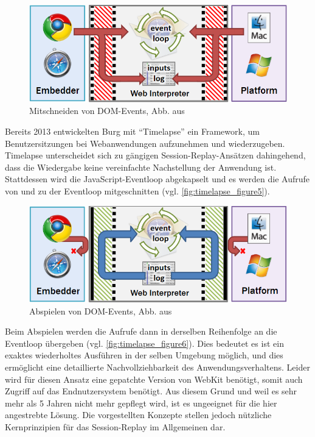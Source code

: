 \begin{figure}
\centering
\includegraphics[width=\linewidth]{img/03_methoden/timelapse_figure5.png}
\caption{Mitschneiden von DOM-Events, Abb. aus \cite{TimelapsePaper}}
\label{fig:timelapse_figure5}
\end{figure}

Bereits 2013 entwickelten Burg \etal \cite{TimelapsePaper} mit \enquote{Timelapse} ein Framework, um Benutzersitzungen bei Webanwendungen aufzunehmen und wiederzugeben. Timelapse unterscheidet sich zu gängigen Session-Replay-Ansätzen dahingehend, dass die Wiedergabe keine vereinfachte Nachstellung der Anwendung ist. Stattdessen wird die JavaScript-Eventloop abgekapselt und es werden die Aufrufe von und zu der Eventloop mitgeschnitten (vgl. \autoref{fig:timelapse_figure5}).

\begin{figure}
\centering
\includegraphics[width=\linewidth]{img/03_methoden/timelapse_figure6.png}
\caption{Abspielen von DOM-Events, Abb. aus \cite{TimelapsePaper}}
\label{fig:timelapse_figure6}
\end{figure}

Beim Abspielen werden die Aufrufe dann in derselben Reihenfolge an die Eventloop übergeben (vgl. \autoref{fig:timelapse_figure6}). Dies bedeutet es ist ein exaktes wiederholtes Ausführen in der selben Umgebung möglich, und dies ermöglicht eine detaillierte Nachvollziehbarkeit des Anwendungsverhaltens. Leider wird für diesen Ansatz eine gepatchte Version von WebKit benötigt, somit auch Zugriff auf das Endnutzersystem benötigt. Aus diesem Grund und weil es sehr mehr als 5 Jahren nicht mehr gepflegt wird\footnotemark{}, ist es ungeeignet für die hier angestrebte Lösung. Die vorgestellten Konzepte stellen jedoch nützliche Kernprinzipien für das Session-Replay im Allgemeinen dar.

